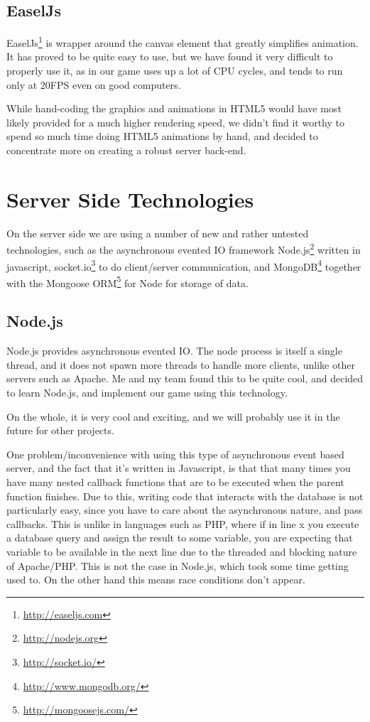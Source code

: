 \documentclass[a4paper,11pt]{article}
\begin{document}
		\subsection{EaselJs}
			EaselJs\footnote{\url{http://easeljs.com}} is wrapper around the canvas element that greatly simplifies animation. It has proved to be quite easy to use, but we have found it very difficult to properly use it, as in our game uses up a lot of CPU cycles, and tends to run only at 20FPS even on good computers. 
			
			While hand-coding the graphics and animations in HTML5 would have most likely provided for a much higher rendering speed, we didn't find it worthy to spend so much time doing HTML5 animations by hand, and decided to concentrate more on creating a robust server back-end.
					
	\section{Server Side Technologies}
		On the server side we are using a number of new and rather untested technologies, such as the asynchronous evented IO framework Node.js\footnote{\url{http://nodejs.org}} written in javascript, socket.io\footnote{\url{http://socket.io/}} to do client/server communication, and MongoDB\footnote{\url{http://www.mongodb.org/}} together with the Mongoose ORM\footnote{\url{http://mongoosejs.com/}}  for Node for storage of data.
	
		\subsection{Node.js}
		
			Node.js provides asynchronous evented IO. The node process is itself a single thread, and it does not spawn more threads to handle more clients, unlike other servers such as Apache. Me and my team found this to be quite cool, and decided to learn Node.js, and implement our game using this technology.
			
			On the whole, it is very cool and exciting, and we will probably use it in the future for other projects.
			
			One problem/inconvenience with using this type of asynchronous event based server, and the fact that it's written in Javascript, is that that many times you have many nested callback functions that are to be executed when the parent function finishes. Due to this, writing code that interacts with the database is not particularly easy, since you have to care about the asynchronous nature, and pass callbacks. This is unlike in languages such as PHP, where if in line x you execute a database query and assign the result to some variable, you are expecting that variable to be available in the next line due to the threaded and blocking nature of Apache/PHP. This is not the case in Node.js, which took some time getting used to. On the other hand this means race conditions don't appear.
			
\end{document}
